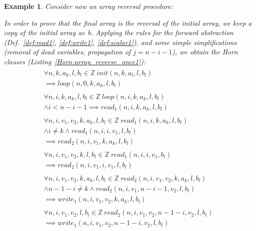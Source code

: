 \documentclass[a4paper]{article}
\newcommand{\ZZ}{\mathbb{Z}}
\theoremstyle{definition}
\theoremstyle{plain}
\newtheorem{example}{Example}
\newcommand{\rulespacing}{\\[0.4em]}
\begin{document}
\begin{example}\label{ex:array_reverse_once1}
Consider now an array reversal procedure:


In order to prove that the final array is the reversal of the initial array, we keep a copy of the initial array as~$b$.
Applying the rules for the forward abstraction (Def.~\ref{def:read1}, \ref{def:write1}, \ref{def:scalar1}), and some simple simplifications (removal of dead variables, propagation of $j = n-i-1$), we obtain the Horn clauses (Listing~\ref{Horn:array_reverse_once1}):
{\small\begin{align}
\begin{aligned}
\forall n,k,a_k,l,b_l \in \ZZ~
   \mathit{init}(n,k,a_l,l,b_l) \\\implies \mathit{loop}(n,0,k,a_k,l,b_l)
\end{aligned}\rulespacing
\begin{aligned}
\forall n,i,k,a_k,l,b_l \in \ZZ~
   \mathit{loop}(n,i,k,a_k,l,b_l) \\ \land i< n-i-1 \implies
   \mathit{read}_1(n,i,k,a_k,l,b_l)
\end{aligned}\rulespacing
\begin{aligned}
\forall n,i,v_1,v_2,k,a_k,l,b_l \in \ZZ~
   \mathit{read}_1(n,i,k,a_k,l,b_l) \\ \land i \neq k \land
   \mathit{read}_1(n,i,i,v_1,l,b_l) \\ \implies
   \mathit{read}_2(n,i,v_1,k,a_k,l,b_l)
\end{aligned}\rulespacing
\begin{aligned}
\forall n,i,v_1,v_2,k,l,b_l \in \ZZ~
   \mathit{read}_1(n,i,i,v_1,b_l) \\ \implies
   \mathit{read}_2(n,i,v_1,i,v_1,l,b_l)
\end{aligned}\rulespacing
\begin{aligned}
\forall n,i,v_1,v_2,k,a_k,l,b_l \in \ZZ~
   \mathit{read}_2(n,i,v_1,v_2,k,a_k,l,b_l) \\\land n-1-i \neq k \land
   \mathit{read}_2(n,i,v_1,n-i-1,v_2,l,b_l)\\ \implies
   \mathit{write}_1(n,i,v_1,v_2,k,a_k,l,b_l)
\end{aligned}\rulespacing
\begin{aligned}
\forall n,i,v_1,v_2,l,b_l \in \ZZ~
   \mathit{read}_2(n,i,v_1,v_2,n-1-i,v_2,l,b_l) \\ \implies
   \mathit{write}_1(n,i,v_1,v_2,n-1-i,v_2,l,b_l)

\end{aligned}
\end{align}}
\end{example}
\end{document}
